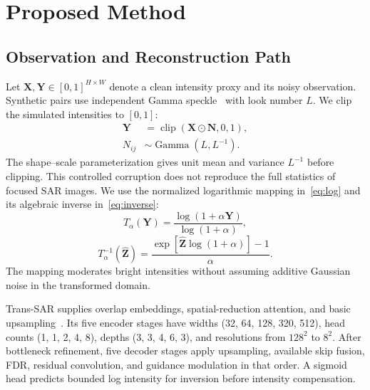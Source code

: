 \documentclass[journal]{IEEEtran}
\newcommand{\vect}[1]{\bm{#1}}
\begin{document}
\section{Proposed Method}
\subsection{Observation and Reconstruction Path}
Let \(\vect{X},\vect{Y}\in[0,1]^{H\times W}\) denote a clean intensity proxy and its noisy observation. Synthetic pairs use independent Gamma speckle~\cite{perera2022} with look number \(L\). We clip the simulated intensities to \([0,1]\):
\begin{equation}
\begin{aligned}
\vect{Y} &= \operatorname{clip}(\vect{X}\odot\vect{N},0,1),\\
N_{ij} &\sim \operatorname{Gamma}(L,L^{-1}).
\end{aligned}
\label{eq:observation}
\end{equation}
The shape--scale parameterization gives unit mean and variance \(L^{-1}\) before clipping. This controlled corruption does not reproduce the full statistics of focused SAR images. We use the normalized logarithmic mapping in~\eqref{eq:log} and its algebraic inverse in~\eqref{eq:inverse}:
\begin{equation}
T_{\alpha}(\vect{Y})=
\frac{\log(1+\alpha\vect{Y})}{\log(1+\alpha)},
\label{eq:log}
\end{equation}
\begin{equation}
T_{\alpha}^{-1}(\widehat{\vect{Z}})=
\frac{\exp[\widehat{\vect{Z}}\log(1+\alpha)]-1}{\alpha}.
\label{eq:inverse}
\end{equation}
The mapping moderates bright intensities without assuming additive Gaussian noise in the transformed domain.

Trans-SAR supplies overlap embeddings, spatial-reduction attention, and basic upsampling~\cite{perera2022}. Its five encoder stages have widths (32, 64, 128, 320, 512), head counts (1, 1, 2, 4, 8), depths (3, 3, 4, 6, 3), and resolutions from \(128^2\) to \(8^2\). After bottleneck refinement, five decoder stages apply upsampling, available skip fusion, FDR, residual convolution, and guidance modulation in that order. A sigmoid head predicts bounded log intensity for inversion before intensity compensation.
\end{document}
